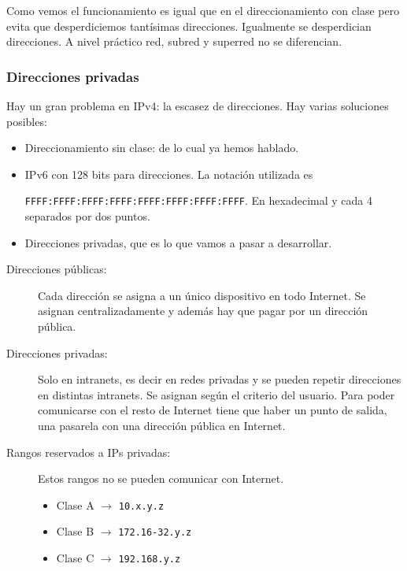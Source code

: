 Como vemos el funcionamiento es igual que en el direccionamiento con clase pero evita que desperdiciemos tantísimas direcciones. Igualmente se desperdician direcciones. A nivel práctico red, subred y superred no se diferencian. 




\subsubsection{Direcciones privadas}

Hay un gran problema en \acrshort{IPv4:} la escasez de direcciones. Hay varias soluciones posibles: 
\begin{itemize}
    \item Direccionamiento sin clase: de lo cual ya hemos hablado.
    \item \acrshort{IPv6} con 128 bits para direcciones. La notación utilizada es\

        \verb|FFFF:FFFF:FFFF:FFFF:FFFF:FFFF:FFFF:FFFF|. En hexadecimal y cada 4 separados por dos puntos. 
    \item Direcciones privadas, que es lo que vamos a pasar a desarrollar.
\end{itemize}

\begin{description}
    \item [Direcciones públicas: ] Cada dirección se asigna a un único dispositivo en todo Internet. Se asignan centralizadamente y además hay que pagar por un dirección pública. 
    \item [Direcciones privadas: ] Solo en intranets, es decir en redes privadas y se pueden repetir direcciones en distintas intranets. Se asignan según el criterio del usuario. Para poder comunicarse con el resto de Internet tiene que haber un punto de salida, una pasarela con una dirección pública en Internet. 
    \item [Rangos reservados a IPs privadas:] 
    Estos rangos no se pueden comunicar con Internet.\
    \begin{itemize}
        \item Clase A $\rightarrow$ \verb|10.x.y.z|
        \item Clase B $\rightarrow$ \verb|172.16-32.y.z|
        \item Clase C $\rightarrow$ \verb|192.168.y.z|
    \end{itemize}
\end{description}

